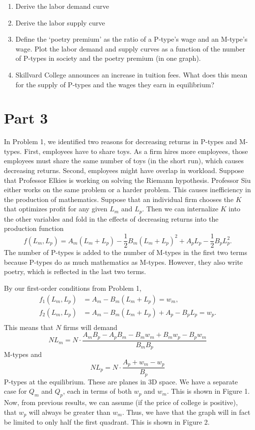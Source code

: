 \documentclass[12pt]{article}
\begin{document}
\begin{enumerate}
\begin{enumerate}
	\item{Derive the labor demand curve}
	\item{Derive the labor supply curve}
	\item{Define the `poetry premium’ as the ratio of a P-type’s wage and an M-type’s
wage. Plot the labor demand and supply curves as a function of the number of
P-types in society and the poetry premium (in one graph).}
	\item{Skillvard College announces an increase in tuition fees. What does this mean
for the supply of P-types and the wages they earn in equilibrium?}

\end{enumerate}

\section*{Part 3}

In Problem 1, we identified two reasons for decreasing returns in P-types and M-types. First, employees have to share toys. As a firm hires more employees, those employees must share the same number of toys (in the short run), which causes decreasing returns. Second, employees might have overlap in workload. Suppose that Professor Elkies is working on solving the Riemann hypothesis. Professor Siu either works on the same problem or a harder problem. This causes inefficiency in the production of mathematics. Suppose that an individual firm chooses the $K$ that optimizes profit for any given $L_m$ and $L_p$. Then we can internalize $K$ into the other variables and fold in the effects of decreasing returns into the production function
\[
    f(L_m, L_p) = A_m(L_m + L_p) - \frac{1}{2}B_m(L_m + L_p)^2 + A_pL_p - \frac{1}{2}B_pL_p^2.
\]
The number of P-types is added to the number of M-types in the first two terms because P-types do as much mathematics as M-types. However, they also write poetry, which is reflected in the last two terms.

By our first-order conditions from Problem 1,
\begin{align*}
    f_1(L_m, L_p) &= A_m - B_m(L_m + L_p) = w_m, \\
    f_2(L_m, L_p) &= A_m - B_m(L_m + L_p) + A_p - B_pL_p = w_p. \\
\end{align*}
This means that $N$ firms will demand
\[
    NL_m = N \cdot \frac{{A_m} {B_p}-{A_p} {B_m}-{B_m}
   {w_m}+{B_m} {w_p}-{B_p} {w_m}}{{B_m} {B_p}}
\]
M-types and
\[
    NL_p = N \cdot \frac{{A_p}+{w_m}-{w_p}}{{B_p}}
\]
P-types at the equilibrium. These are planes in 3D space. We have a separate case for $Q_m$ and $Q_p$, each in terms of both $w_p$ and $w_m$.  This is shown in Figure 1.  Now, from previous results, we can assume (if the price of college is positive), that $w_p$ will always be greater than $w_m$.  Thus, we have that the graph will in fact be limited to only half the first quadrant.  This is shown in Figure 2.



\end{enumerate}
\end{document}
